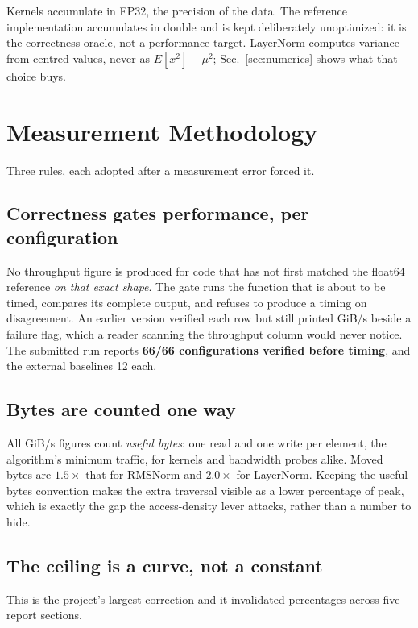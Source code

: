 \documentclass[conference,10pt]{IEEEtran}
\begin{document}
Kernels accumulate in FP32, the precision of the data. The reference
implementation accumulates in double and is kept deliberately unoptimized: it is
the correctness oracle, not a performance target. LayerNorm computes variance
from centred values, never as $E[x^2]-\mu^2$; Sec.~\ref{sec:numerics} shows what
that choice buys.

\section{Measurement Methodology}
\label{sec:method}

Three rules, each adopted after a measurement error forced it.

\subsection{Correctness gates performance, per configuration}

No throughput figure is produced for code that has not first matched the float64
reference \emph{on that exact shape}. The gate runs the function that is about
to be timed, compares its complete output, and refuses to produce a timing on
disagreement. An earlier version verified each row but still printed GiB/s
beside a failure flag, which a reader scanning the throughput column would never
notice. The submitted run reports \textbf{66/66 configurations verified before
timing}, and the external baselines 12 each.

\subsection{Bytes are counted one way}

All GiB/s figures count \emph{useful bytes}: one read and one write per element,
the algorithm's minimum traffic, for kernels and bandwidth probes alike. Moved
bytes are $1.5\times$ that for RMSNorm and $2.0\times$ for LayerNorm. Keeping
the useful-bytes convention makes the extra traversal visible as a lower
percentage of peak, which is exactly the gap the access-density lever attacks,
rather than a number to hide.

\subsection{The ceiling is a curve, not a constant}
\label{sec:ceiling}

This is the project's largest correction and it invalidated percentages across
five report sections.
\end{document}
